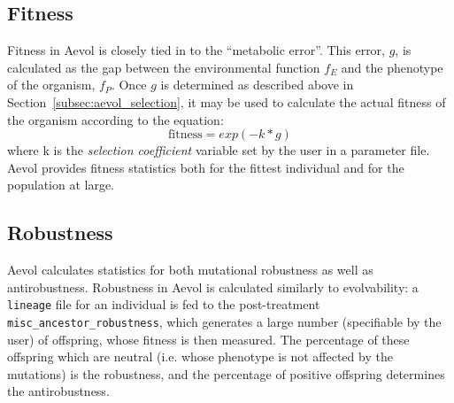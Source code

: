\subsection{Fitness}
Fitness in Aevol is closely tied in to the ``metabolic error''. This error, $g$, is calculated as the gap between the environmental function $f_E$ and the phenotype of the organism, $f_P$. Once $g$ is determined as described above in Section~\ref{subsec:aevol_selection}, it may be used to calculate the actual fitness of the organism according to the equation:
\begin{equation*}
\text{fitness} = exp(-k*g)
\end{equation*} 
where k is the \textit{selection coefficient} variable set by the user in a parameter file. Aevol provides fitness statistics both for the fittest individual and for the population at large.
\subsection{Robustness}
Aevol calculates statistics for both mutational robustness as well as antirobustness. Robustness in Aevol is calculated similarly to evolvability: a \texttt{lineage} file for an individual is fed to the post-treatment \texttt{misc\_ancestor\_robustness}, which generates a large number (specifiable by the user) of offspring, whose fitness is then measured. The percentage of these offspring which are neutral (i.e. whose phenotype is not affected by the mutations) is the robustness, and the percentage of positive offspring determines the antirobustness.

